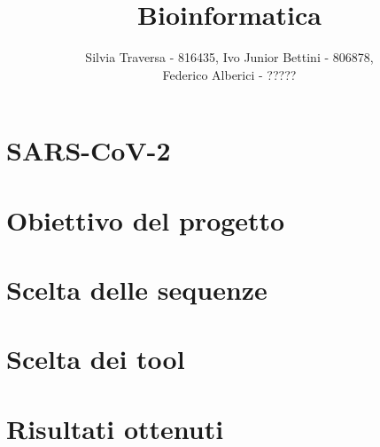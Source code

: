 \documentclass[a4paper,10pt]{article}
\title{Bioinformatica}
\author{Silvia Traversa - 816435, Ivo Junior Bettini - 806878, \\ Federico Alberici - ?????}
\date{}
\begin{document}
\maketitle 

\section*{SARS-CoV-2}

\section*{Obiettivo del progetto}

\section*{Scelta delle sequenze}

\section*{Scelta dei tool}

\section*{Risultati ottenuti}
\end{document}
